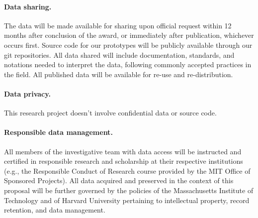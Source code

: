 \paragraph{Data sharing.}
The data will be made available for sharing upon official request within
12 months after conclusion of the award, or immediately after publication,
whichever occurs first.  Source code for our prototypes will be publicly
available through our git repositories.  All data shared will include
documentation, standards, and notations needed to interpret the data,
following commonly accepted practices in the field.  All published data
will be available for re-use and re-distribution.

\paragraph{Data privacy.}
This research project doesn't involve confidential data or source code.

\paragraph{Responsible data management.}
All members of the investigative team with data access will be
instructed and certified in responsible research and scholarship at
their respective institutions (e.g., the Responsible Conduct of Research
course provided by the MIT Office of Sponsored Projects).  All data
acquired and preserved in the context of this proposal will be further
governed by the policies of the Massachusetts Institute of Technology
and of Harvard University pertaining to intellectual property, record
retention, and data management.

